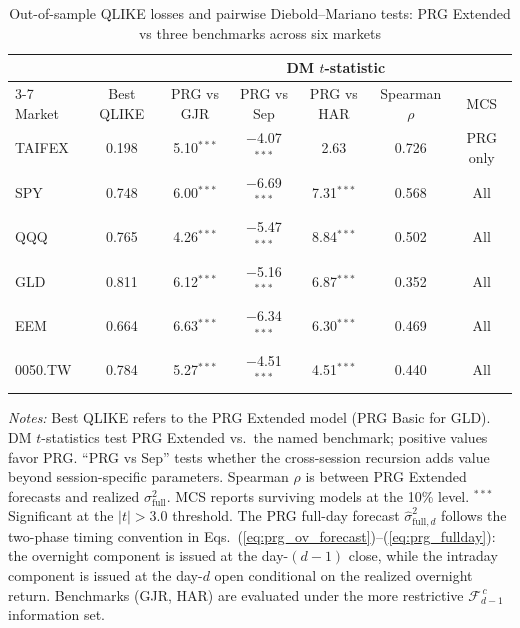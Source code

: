 \documentclass[11pt,a4paper]{article}
\begin{document}
\begin{table}[htbp]
\centering
\caption{Out-of-sample QLIKE losses and pairwise Diebold--Mariano tests: PRG Extended vs three benchmarks across six markets}
\label{tab:main_results}
\small
\begin{tabular}{lcccccc}
\toprule
 & & \multicolumn{5}{c}{DM $t$-statistic} \\
\cmidrule(lr){3-7}
Market & Best QLIKE & PRG vs GJR & PRG vs Sep & PRG vs HAR & Spearman $\rho$ & MCS \\
\midrule
TAIFEX  & 0.198 & 5.10$^{***}$ & $-$4.07$^{***}$ & 2.63 & 0.726 & PRG only \\
SPY     & 0.748 & 6.00$^{***}$ & $-$6.69$^{***}$ & 7.31$^{***}$ & 0.568 & All \\
QQQ     & 0.765 & 4.26$^{***}$ & $-$5.47$^{***}$ & 8.84$^{***}$ & 0.502 & All \\
GLD     & 0.811 & 6.12$^{***}$ & $-$5.16$^{***}$ & 6.87$^{***}$ & 0.352 & All \\
EEM     & 0.664 & 6.63$^{***}$ & $-$6.34$^{***}$ & 6.30$^{***}$ & 0.469 & All \\
0050.TW & 0.784 & 5.27$^{***}$ & $-$4.51$^{***}$ & 4.51$^{***}$ & 0.440 & All \\
\bottomrule
\end{tabular}
\begin{flushleft}
\footnotesize
\emph{Notes:} Best QLIKE refers to the PRG Extended model (PRG Basic for GLD). DM $t$-statistics test PRG Extended vs.\ the named benchmark; positive values favor PRG. ``PRG vs Sep'' tests whether the cross-session recursion adds value beyond session-specific parameters. Spearman $\rho$ is between PRG Extended forecasts and realized $\sigma^2_{\text{full}}$. MCS reports surviving models at the 10\% level. $^{***}$Significant at the \citet{Harvey2016} $|t| > 3.0$ threshold. The PRG full-day forecast $\hat{\sigma}^2_{\text{full},d}$ follows the two-phase timing convention in Eqs.~(\ref{eq:prg_ov_forecast})--(\ref{eq:prg_fullday}): the overnight component is issued at the day-$(d-1)$ close, while the intraday component is issued at the day-$d$ open conditional on the realized overnight return. Benchmarks (GJR, HAR) are evaluated under the more restrictive $\mathcal{F}_{d-1}^{\,c}$ information set.
\end{flushleft}
\end{table}
\end{document}
